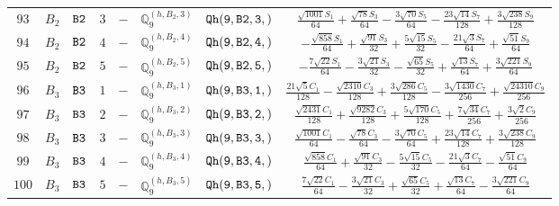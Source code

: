 \documentclass[fleqn,8pt]{jsarticle}
\begin{document}
\begin{table}[ht!]
\begin{center}
\begin{tabular}{cccccccc}
$ 93 $ & $ B_{2} $ & $ {\tt B2} $ & $ 3 $ & $ - $ & $ \mathbb{Q}_{9}^{(h,B_{2},3)} $ & $ {\tt Qh(9,B2,3,)} $ & $ \frac{\sqrt{1001} S_{1}}{64} + \frac{\sqrt{78} S_{3}}{64} - \frac{3 \sqrt{70} S_{5}}{64} - \frac{23 \sqrt{14} S_{7}}{128} + \frac{3 \sqrt{238} S_{9}}{128} $ \\
$ 94 $ & $ B_{2} $ & $ {\tt B2} $ & $ 4 $ & $ - $ & $ \mathbb{Q}_{9}^{(h,B_{2},4)} $ & $ {\tt Qh(9,B2,4,)} $ & $ - \frac{\sqrt{858} S_{1}}{64} + \frac{\sqrt{91} S_{3}}{32} + \frac{5 \sqrt{15} S_{5}}{32} - \frac{21 \sqrt{3} S_{7}}{64} + \frac{\sqrt{51} S_{9}}{64} $ \\
$ 95 $ & $ B_{2} $ & $ {\tt B2} $ & $ 5 $ & $ - $ & $ \mathbb{Q}_{9}^{(h,B_{2},5)} $ & $ {\tt Qh(9,B2,5,)} $ & $ - \frac{7 \sqrt{22} S_{1}}{64} - \frac{3 \sqrt{21} S_{3}}{32} - \frac{\sqrt{65} S_{5}}{32} + \frac{\sqrt{13} S_{7}}{64} + \frac{3 \sqrt{221} S_{9}}{64} $ \\
$ 96 $ & $ B_{3} $ & $ {\tt B3} $ & $ 1 $ & $ - $ & $ \mathbb{Q}_{9}^{(h,B_{3},1)} $ & $ {\tt Qh(9,B3,1,)} $ & $ \frac{21 \sqrt{5} C_{1}}{128} - \frac{\sqrt{2310} C_{3}}{128} + \frac{3 \sqrt{286} C_{5}}{128} - \frac{3 \sqrt{1430} C_{7}}{256} + \frac{\sqrt{24310} C_{9}}{256} $ \\
$ 97 $ & $ B_{3} $ & $ {\tt B3} $ & $ 2 $ & $ - $ & $ \mathbb{Q}_{9}^{(h,B_{3},2)} $ & $ {\tt Qh(9,B3,2,)} $ & $ \frac{\sqrt{2431} C_{1}}{128} + \frac{\sqrt{9282} C_{3}}{128} + \frac{5 \sqrt{170} C_{5}}{128} + \frac{7 \sqrt{34} C_{7}}{256} + \frac{3 \sqrt{2} C_{9}}{256} $ \\
$ 98 $ & $ B_{3} $ & $ {\tt B3} $ & $ 3 $ & $ - $ & $ \mathbb{Q}_{9}^{(h,B_{3},3)} $ & $ {\tt Qh(9,B3,3,)} $ & $ \frac{\sqrt{1001} C_{1}}{64} - \frac{\sqrt{78} C_{3}}{64} - \frac{3 \sqrt{70} C_{5}}{64} + \frac{23 \sqrt{14} C_{7}}{128} + \frac{3 \sqrt{238} C_{9}}{128} $ \\
$ 99 $ & $ B_{3} $ & $ {\tt B3} $ & $ 4 $ & $ - $ & $ \mathbb{Q}_{9}^{(h,B_{3},4)} $ & $ {\tt Qh(9,B3,4,)} $ & $ \frac{\sqrt{858} C_{1}}{64} + \frac{\sqrt{91} C_{3}}{32} - \frac{5 \sqrt{15} C_{5}}{32} - \frac{21 \sqrt{3} C_{7}}{64} - \frac{\sqrt{51} C_{9}}{64} $ \\
$ 100 $ & $ B_{3} $ & $ {\tt B3} $ & $ 5 $ & $ - $ & $ \mathbb{Q}_{9}^{(h,B_{3},5)} $ & $ {\tt Qh(9,B3,5,)} $ & $ \frac{7 \sqrt{22} C_{1}}{64} - \frac{3 \sqrt{21} C_{3}}{32} + \frac{\sqrt{65} C_{5}}{32} + \frac{\sqrt{13} C_{7}}{64} - \frac{3 \sqrt{221} C_{9}}{64} $ \\
 \hline \hline
\end{tabular}
\end{center}
\end{table}
\end{document}
